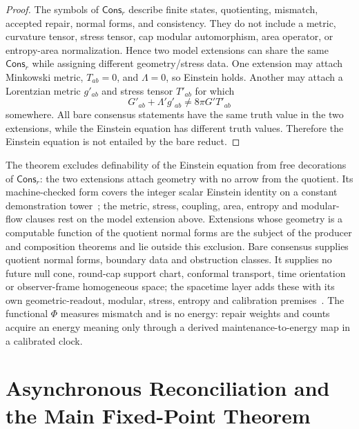 \documentclass[11pt]{article}
\theoremstyle{remark}
\theoremstyle{plain}
\begin{document}
\begin{proof}
The symbols of \(\mathsf{Cons}_r\) describe finite states, quotienting,
mismatch, accepted repair, normal forms, and consistency. They do not include a
metric, curvature tensor, stress tensor, cap modular automorphism, area
operator, or entropy-area normalization. Hence two model extensions can share
the same \(\mathsf{Cons}_r\) while assigning different geometry/stress data.
One extension may attach Minkowski metric, \(T_{ab}=0\), and \(\Lambda=0\), so
Einstein holds. Another may attach a Lorentzian metric \(g'_{ab}\) and stress
tensor \(T'_{ab}\) for which
\[
G'_{ab}+\Lambda' g'_{ab}\ne 8\pi G' T'_{ab}
\]
somewhere. All bare consensus statements have the same truth value in the two
extensions, while the Einstein equation has different truth values. Therefore
the Einstein equation is not entailed by the bare reduct.
\end{proof}

The theorem excludes definability of the Einstein equation from free
decorations of \(\mathsf{Cons}_r\): the two extensions attach geometry with
no arrow from the quotient. Its machine-checked form covers the integer
scalar Einstein identity on a constant demonstration
tower~\cite{ophrepo}; the metric, stress, coupling, area, entropy and
modular-flow clauses rest on the model extension above. Extensions whose
geometry is a computable function of the quotient normal forms are the
subject of the producer and composition theorems and lie outside this
exclusion. Bare consensus supplies quotient normal forms, boundary data and
obstruction classes. It supplies no future null cone, round-cap support
chart, conformal transport, time orientation or observer-frame homogeneous
space; the spacetime layer adds these with its own geometric-readout,
modular, stress, entropy and calibration premises~\cite{ophEinstein}.
The functional \(\Phi\) measures mismatch and is no energy: repair weights
and counts acquire an energy meaning only through a derived
maintenance-to-energy map in a calibrated clock.


\section{Asynchronous Reconciliation and the Main Fixed-Point Theorem}
\end{document}
